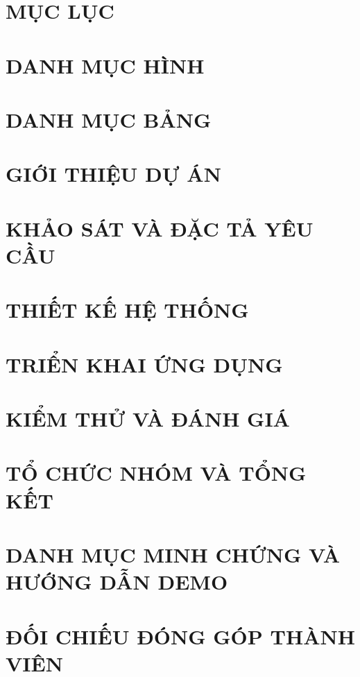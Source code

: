\documentclass[a4paper,12pt,oneside]{report}
\renewcommand{\contentsname}{MỤC LỤC}
\renewcommand{\listfigurename}{DANH MỤC HÌNH}
\renewcommand{\listtablename}{DANH MỤC BẢNG}
\begin{document}
\hypersetup{pageanchor=false}

\clearpage
{}
\hypersetup{pageanchor=true}

\clearpage


\clearpage
\makeatletter
\chapter*{\contentsname}
{\small{}}
\clearpage
\chapter*{\listfigurename}
{\small{}\let\addvspace\@gobble{}}
\clearpage
\chapter*{\listtablename}
{\small{}\let\addvspace\@gobble{}}
\makeatother
\clearpage
{}
\chapter{GIỚI THIỆU DỰ ÁN}\label{chap:intro}

\FloatBarrier
\chapter{KHẢO SÁT VÀ ĐẶC TẢ YÊU CẦU}\label{chap:requirements}

\FloatBarrier
\chapter{THIẾT KẾ HỆ THỐNG}\label{chap:design}

\FloatBarrier
\chapter{TRIỂN KHAI ỨNG DỤNG}\label{chap:implementation}

\FloatBarrier
\chapter{KIỂM THỬ VÀ ĐÁNH GIÁ}\label{chap:testing}

\FloatBarrier
\chapter{TỔ CHỨC NHÓM VÀ TỔNG KẾT}\label{chap:team}

\label{main:end}
\FloatBarrier
\clearpage
{}

\appendix
{}
\chapter[DANH MỤC MINH CHỨNG VÀ DEMO]{DANH MỤC MINH CHỨNG VÀ HƯỚNG DẪN DEMO}\label{app:evidence}

\FloatBarrier
\chapter{ĐỐI CHIẾU ĐÓNG GÓP THÀNH VIÊN}\label{app:contributions}
{\small{}}
\end{document}
